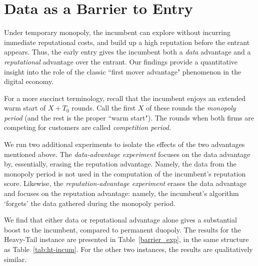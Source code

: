 \documentclass[../competing_bandits_with_appendix.tex]{subfiles}
\begin{document}
\section{Data as a Barrier to Entry}\label{section:6}



Under temporary monopoly, the incumbent can explore without incurring immediate reputational costs, and build up a high reputation before the entrant appears. Thus, the early entry gives the incumbent both a \textit{data} advantage and a \textit{reputational} advantage over the entrant.   Our findings provide a quantitative insight into the role of the classic ``first mover advantage" phenomenon in the digital economy. 


For a more succinct terminology, recall that the incumbent enjoys an extended warm start of $X+T_0$ rounds. Call the first $X$ of these rounds the \emph{monopoly period} (and the rest is the proper ``warm start"). The rounds when both firms are competing for customers are called \emph{competition period.}

We run two additional experiments to isolate the effects of the two
advantages mentioned above. The \emph{data-advantage experiment} focuses on the data advantage by, essentially, erasing the reputation advantage. Namely, the data from the monopoly period is not used in the computation of the incumbent's reputation score. Likewise, the \emph{reputation-advantage experiment} erases the data advantage and focuses on the reputation advantage: namely, the incumbent's algorithm `forgets' the data gathered during the monopoly period.

We find that either data or reputational advantage alone gives a substantial boost to the incumbent, compared to permanent duopoly. The results for the Heavy-Tail instance are presented in Table~\ref{barrier_exp}, in the same structure as Table~\ref{tab:ht-incum}. For the other two instances, the results are qualitatively similar.
\end{document}

